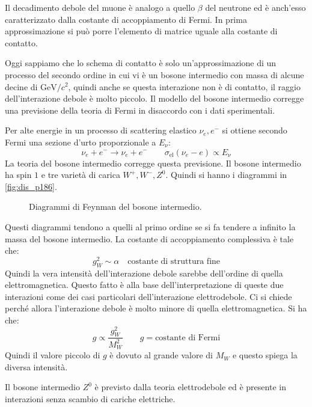 Il decadimento debole del muone è analogo a quello $\beta$ del neutrone ed è anch'esso caratterizzato dalla
costante di accoppiamento di Fermi.
In prima approssimazione si può porre l'elemento di matrice uguale alla costante di contatto.

Oggi sappiamo che lo schema di contatto è solo un'approssimazione di un processo del secondo ordine in cui vi è
un bosone intermedio con massa di alcune decine di $\si{\giga\electronvolt}/c^2$, quindi anche se questa
interazione non è di contatto, il raggio dell'interazione debole è molto piccolo.
Il modello del bosone intermedio corregge una previsione della teoria di Fermi in disaccordo con i dati sperimentali.

Per alte energie in un processo di scattering elastico $\nu_e,e^-$ si ottiene secondo Fermi una sezione
d'urto proporzionale a $E_{\nu}$:
\[
\nu_e+e^-\rightarrow \nu_e+e^-\qquad \sigma_{\text{el}}(\nu_e-e)\propto E_{\nu}
\]
La teoria del bosone intermedio corregge questa previsione. Il bosone intermedio ha spin $1$ e tre varietà di
carica $W^+,W^-,Z^0$.
Quindi si hanno i diagrammi in \autoref{fig:dis_p186}.
\begin{figure}[!h]
  \centering
  \caption{Diagrammi di Feynman del bosone intermedio.}
  \label{fig:dis_p186}
  
\end{figure}

Questi diagrammi tendono a quelli al primo ordine se si fa tendere a infinito la massa del bosone intermedio.
La costante di accoppiamento complessiva è tale che:
\[
g_{W}^2\sim\alpha\quad\text{costante di struttura fine}
\]
Quindi la vera intensità dell'interazione debole sarebbe dell'ordine di quella elettromagnetica.
Questo fatto è alla base dell'interpretazione di queste due interazioni come dei casi particolari dell'interazione elettrodebole.
Ci si chiede perché allora l'interazione debole è molto minore di quella elettromagnetica. Si ha che:
\[
g\propto\frac{g_W^2}{M_W^2}\qquad g=\text{costante di Fermi}
\]
Quindi il valore piccolo di $g$ è dovuto al grande valore di $M_W$ e questo spiega la diversa intensità.

Il bosone intermedio $Z^0$ è previsto dalla teoria elettrodebole ed è presente in interazioni senza scambio di cariche elettriche.
